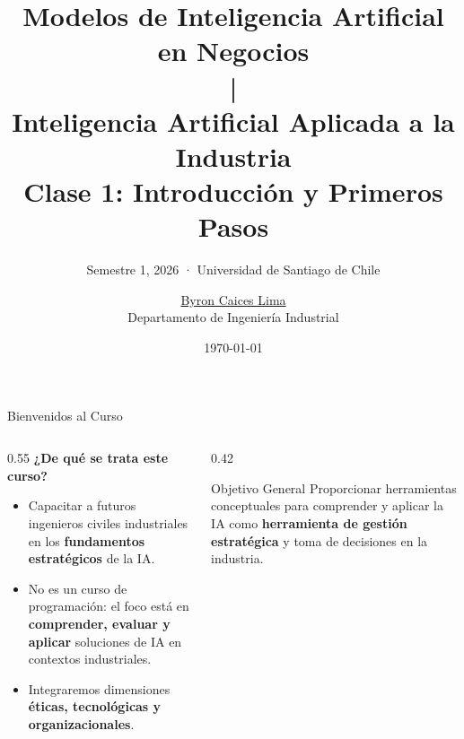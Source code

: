 \documentclass[aspectratio=169]{beamer}
\title{Modelos de Inteligencia Artificial en Negocios\\{\normalsize |}\\ Inteligencia Artificial Aplicada a la Industria\\{\tiny Clase 1: Introducción y Primeros Pasos}}
\subtitle{{\small Semestre 1, 2026 · Universidad de Santiago de Chile}}
\author{\href{https://www.linkedin.com/in/byron-caices/}{Byron Caices Lima} \\ \small Departamento de Ingeniería Industrial}
\date{\today}
\begin{document}
\maketitle


\begin{frame}{Bienvenidos al Curso}
  \begin{columns}[T]
    \begin{column}{0.55\textwidth}
      \small
      \textbf{¿De qué se trata este curso?}
      \begin{itemize}\setlength\itemsep{4pt}
        \item Capacitar a futuros ingenieros civiles industriales en los
              \textbf{fundamentos estratégicos} de la IA.
        \item No es un curso de programación: el foco está en
              \textbf{comprender, evaluar y aplicar} soluciones de IA
              en contextos industriales.
        \item Integraremos dimensiones \textbf{éticas, tecnológicas
              y organizacionales}.
      \end{itemize}
    \end{column}
    \begin{column}{0.42\textwidth}
      \begin{conceptbox}{\faRocket\enspace Objetivo General}
        \small
        Proporcionar herramientas conceptuales para comprender y aplicar
        la IA como \textbf{herramienta de gestión estratégica} y toma
        de decisiones en la industria.
      \end{conceptbox}
    \end{column}
  \end{columns}
\end{frame}
\end{document}
